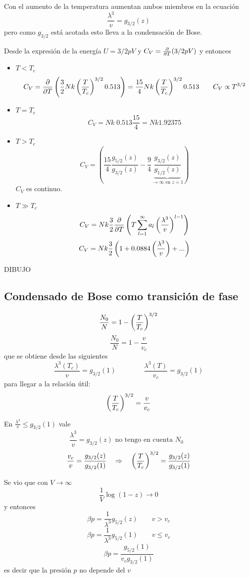 \documentclass[10pt,oneside]{CBFT_book}
\begin{document}
Con el aumento de la temperatura aumentan ambos miembros en la ecuación 
\[
	\frac{\lambda^3}{v} = g_{3/2}(z)
\]
pero como $g_{3/2}$ está acotada esto lleva a la condensación de Bose.

Desde la expresión de la energía $ U = 3/2 p V $ y $C_V = \frac{\partial^{\hspace{-0.05em}} {}}{\partial {T}^{\hspace{-0.05em}}}(3/2 p V)$
y entonces
\begin{itemize}
 \item $ T < T_c $ 
 \[
	C_V = \frac{\partial^{\hspace{-0.05em}} {}}{\partial {T}^{\hspace{-0.05em}}}\left( \frac{3}{2} N k \left( \frac{ T }{ T_c } \right)^{3/2} 0.513  \right) = 
	\frac{15}{4} N k \left( \frac{ T }{ T_c } \right)^{3/2} 0.513 \qquad C_V \propto T^{3/2}
 \]
 \item $ T = T_c $ 
 \[
	C_V = N k \; 0.513 \frac{15}{4} = N k 1.92375
 \]
 \item $ T > T_c $ 
 \[
	C_V = \left( \frac{15}{4}\frac{ g_{5/2}(z) }{ g_{3/2}(z) } - 
	\frac{9}{4} \underbrace{\frac{ g_{3/2}(z) }{ g_{1/2}(z) }}_{\to \infty \text{ en } z=1} \right)
 \]
 $C_V$ es continuo.
 \item $ T \gg T_c $ 
 \[
	C_V = N k \frac{3}{2} \frac{\partial^{\hspace{-0.05em}} {}}{\partial {T}^{\hspace{-0.05em}}} \left( T \sum_{l=1}^\infty a_l \left( \frac{ \lambda^3 }{ v } \right)^{l-1} \right)
 \]
 \[
	C_V = N k \frac{3}{2} \left( 1 + 0.0884 \left( \frac{ \lambda^3 }{ v } \right) + ... \right)
 \]
\end{itemize}

DIBUJO

\subsection{Condensado de Bose como transición de fase}

\[
	\frac{N_0}{N} = 1 - \left( \frac{ T }{ T_c } \right)^{3/2}
\]
\[
	\frac{N_0}{N} = 1 - \frac{v}{v_c}
\]
que se obtiene desde las siguientes
\[
	\frac{\lambda^3(T_c)}{v} = g_{3/2}(1) \qquad \qquad  \frac{\lambda^3(T)}{v_c} = g_{3/2}(1)
\]
para llegar a la relación útil:
\[
	\left( \frac{ T }{ T_c } \right)^{3/2} = \frac{v}{v_c}
\]

En $ \frac{\lambda^3}{v} \leq g_{3/2}(1) $ vale 
\[
	\frac{\lambda^3}{v} = g_{3/2}(z) \text{ no tengo en cuenta $N_0$ }
\]
\[
	\frac{v_c}{v} = \frac{ g_{3/2}(z) }{ g_{3/2}(1) } \quad \Rightarrow \quad 
	\left( \frac{ T }{ T_c } \right)^{3/2} = \frac{ g_{3/2}(z) }{ g_{3/2}(1) } 
\]

Se vio que con $ V \to \infty $
\[
	\frac{1}{V} \log (1-z) \to 0 
\]
y entonces 
\[
	\beta p = \frac{1}{\lambda^3} g_{5/2}(z) \qquad v > v_c
\]
\[
	\beta p = \frac{1}{\lambda^3} g_{5/2}(1) \qquad v \leq v_c
\]
\[
	\beta p = \frac{ g_{5/2}(1) }{ v_c g_{3/2}(1) }
\]
es decir que la presión $p$ no depende del $v$
\end{document}
